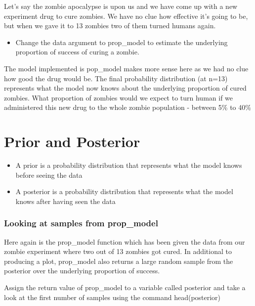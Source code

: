 \documentclass[
]{article}
\providecommand{\tightlist}{%
  \setlength{\itemsep}{0pt}\setlength{\parskip}{0pt}}
\begin{document}
Let's say the zombie apocalypse is upon us and we have come up with a
new experiment drug to cure zombies. We have no clue how effective it's
going to be, but when we gave it to 13 zombies two of them turned humans
again.

\begin{itemize}
\tightlist
\item
  Change the data argument to prop\_model to estimate the underlying
  proportion of success of curing a zombie.
\end{itemize}

The model implemented is pop\_model makes more sense here as we had no
clue how good the drug would be. The final probability distribution (at
n=13) represents what the model now knows about the underlying
proportion of cured zombies. What proportion of zombies would we expect
to turn human if we administered this new drug to the whole zombie
population - between 5\% to 40\%

\hypertarget{prior-and-posterior}{%
\section{Prior and Posterior}\label{prior-and-posterior}}

\begin{itemize}
\tightlist
\item
  A prior is a probability distribution that represents what the model
  knows before seeing the data
\item
  A posterior is a probability distribution that represents what the
  model knows after having seen the data
\end{itemize}

\hypertarget{looking-at-samples-from-prop_model}{%
\subsubsection{Looking at samples from
prop\_model}\label{looking-at-samples-from-prop_model}}

Here again is the prop\_model function which has been given the data
from our zombie experiment where two out of 13 zombies got cured. In
additional to producing a plot, prop\_model also returns a large random
sample from the posterior over the underlying proportion of success.

Assign the return value of prop\_model to a variable called posterior
and take a look at the first number of samples using the command
head(posterior)
\end{document}
